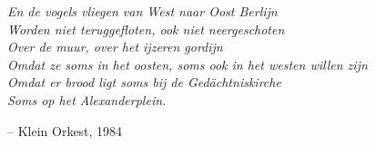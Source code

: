 \thispagestyle{empty} %
\vspace*{3cm}
\begin{center}
\begin{minipage}[c]{0.6\paperwidth}%
    \vspace{2ex}
    \textit{En de vogels vliegen van West naar Oost Berlijn} \\
    \textit{Worden niet teruggefloten, ook niet neergeschoten} \\
    \textit{Over de muur, over het ijzeren gordijn} \\
    \textit{Omdat ze soms in het oosten, soms ook in het westen willen zijn} \\
    \textit{Omdat er brood ligt soms bij de Gedächtniskirche} \\
    \textit{Soms op het Alexanderplein.} \par
    \vspace{2ex}
    \hfill -- Klein Orkest, 1984
  \end{minipage}
\end{center}

\thispagestyle{empty}
\setcounter{page}{1}